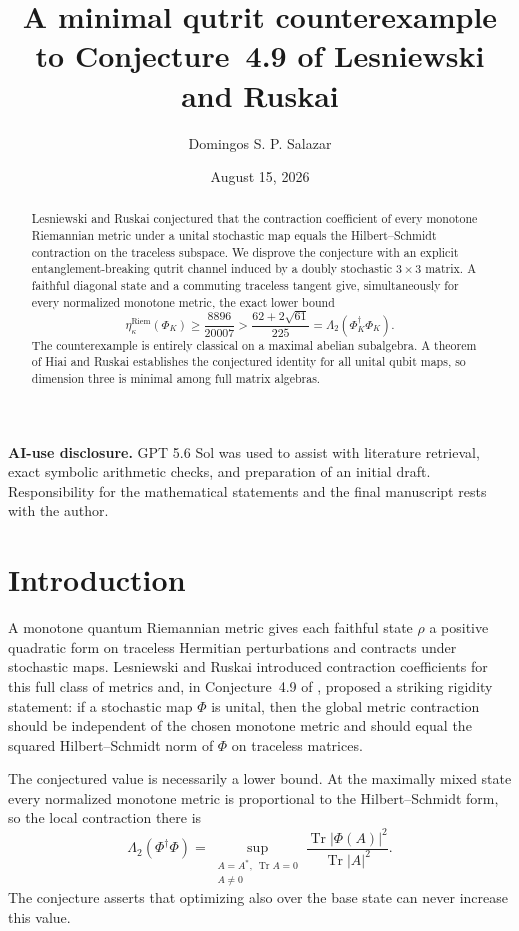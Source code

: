 \documentclass[11pt]{amsart}
\title[A qutrit counterexample to Conjecture 4.9]{A minimal qutrit counterexample to Conjecture~4.9 of Lesniewski and Ruskai}
\author{Domingos S. P. Salazar}
\date{August 15, 2026}
\theoremstyle{definition}
\theoremstyle{remark}
\DeclareMathOperator{\Tr}{Tr}
\newcommand{\Riem}{\mathrm{Riem}}
\newcommand{\PhiK}{\Phi_K}
\begin{document}
\begin{abstract}
Lesniewski and Ruskai conjectured that the contraction coefficient of every monotone Riemannian metric under a unital stochastic map equals the Hilbert--Schmidt contraction on the traceless subspace. We disprove the conjecture with an explicit entanglement-breaking qutrit channel induced by a doubly stochastic $3\times3$ matrix. A faithful diagonal state and a commuting traceless tangent give, simultaneously for every normalized monotone metric, the exact lower bound
\[
  \eta^{\Riem}_{\kappa}(\PhiK)\ge \frac{8896}{20007}
  >\frac{62+2\sqrt{61}}{225}
  =\Lambda_2(\PhiK^{\dagger}\PhiK).
\]
The counterexample is entirely classical on a maximal abelian subalgebra. A theorem of Hiai and Ruskai establishes the conjectured identity for all unital qubit maps, so dimension three is minimal among full matrix algebras.
\end{abstract}

\maketitle

\begin{center}
\begin{minipage}{0.94\textwidth}
\small\textbf{AI-use disclosure.}
GPT 5.6 Sol was used to assist with literature retrieval, exact symbolic arithmetic checks, and preparation of an initial draft. Responsibility for the mathematical statements and the final manuscript rests with the author.
\end{minipage}
\end{center}

\section{Introduction}

A monotone quantum Riemannian metric gives each faithful state $\rho$ a positive quadratic form on traceless Hermitian perturbations and contracts under stochastic maps. Lesniewski and Ruskai introduced contraction coefficients for this full class of metrics and, in Conjecture~4.9 of \cite{LR1999}, proposed a striking rigidity statement: if a stochastic map $\Phi$ is unital, then the global metric contraction should be independent of the chosen monotone metric and should equal the squared Hilbert--Schmidt norm of $\Phi$ on traceless matrices.

The conjectured value is necessarily a lower bound. At the maximally mixed state every normalized monotone metric is proportional to the Hilbert--Schmidt form, so the local contraction there is
\[
 \Lambda_2(\Phi^\dagger\Phi)
 =\sup_{\substack{A=A^*,\ \Tr A=0\\A\ne0}}
 \frac{\Tr|\Phi(A)|^2}{\Tr|A|^2}.
\]
The conjecture asserts that optimizing also over the base state can never increase this value.
\end{document}
